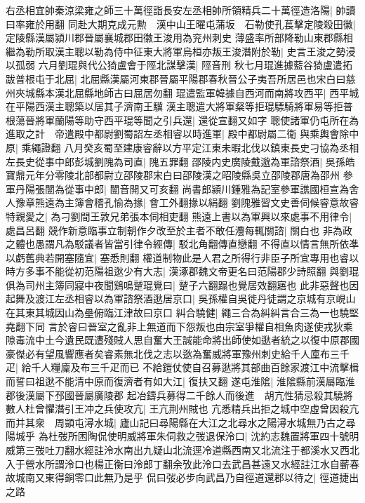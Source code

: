 右丞相宜帥秦涼梁雍之師三十萬徑詣長安左丞相帥所領精兵二十萬徑造洛陽|{
	帥讀曰率雍於用翻}
同赴大期克成元勲　漢中山王曜屯蒲坂　石勒使孔萇擊定陵殺田徽|{
	定陵縣漢屬潁川郡晉屬襄城郡田徽王浚用為兖州刺史}
薄盛率所部降勒山東郡縣相繼為勒所取漢主聰以勒為侍中征東大將軍烏桓亦叛王浚潛附於勒|{
	史言王浚之勢浸以孤弱}
六月劉琨與代公猗盧會于陘北謀擊漢|{
	陘音刑}
秋七月琨進據藍谷猗盧遣拓跋普根屯于北屈|{
	北屈縣漢屬河東郡晉屬平陽郡春秋晉公子夷吾所居邑也宋白曰慈州夾城縣本漢北屈縣地師古曰屈居勿翻}
琨遣監軍韓據自西河而南將攻西平|{
	西平城在平陽西漢主聰築以居其子濟南王驥}
漢主聰遣大將軍粲等拒琨驃騎將軍易等拒普根蕩晉將軍蘭陽等助守西平琨等聞之引兵還|{
	還從宣翻又如字}
聰使諸軍仍屯所在為進取之計　帝遣殿中都尉劉蜀詔左丞相睿以時進軍|{
	殿中都尉屬二衛}
與乘輿會除中原|{
	乘繩證翻}
八月癸亥蜀至建康睿辭以方平定江東未暇北伐以鎮東長史刁協為丞相左長史從事中郎彭城劉隗為司直|{
	隗五罪翻}
邵陵内史廣陵戴邈為軍諮祭酒|{
	吳孫皓寶鼎元年分零陵北部都尉立邵陵郡宋白曰邵陵漢之昭陵縣吳立邵陵郡唐為邵州}
參軍丹陽張闓為從事中郎|{
	闓音開又可亥翻}
尚書郎潁川鍾雅為記室參軍譙國桓宣為舍人豫章熊遠為主簿會稽孔愉為掾|{
	會工外翻掾以絹翻}
劉隗雅習文史善伺候睿意故睿特親愛之|{
	為刁劉間王敦兄弟張本伺相吏翻}
熊遠上書以為軍興以來處事不用律令|{
	處昌呂翻}
競作新意臨事立制朝作夕改至於主者不敢任灋每輒關諮|{
	關白也}
非為政之體也愚謂凡為駁議者皆當引律令經傳|{
	駁北角翻傳直戀翻}
不得直以情言無所依凖以虧舊典若開塞隨宜|{
	塞悉則翻}
權道制物此是人君之所得行非臣子所宜專用也睿以時方多事不能從初范陽祖逖少有大志|{
	漢涿郡魏文帝更名曰范陽郡少詩照翻}
與劉琨俱為司州主簿同寢中夜聞鷄鳴蹵琨覺曰|{
	蹵子六翻蹋也覺居效翻寤也}
此非惡聲也因起舞及渡江左丞相睿以為軍諮祭酒逖居京口|{
	吳孫權自吳徙丹徒謂之京城有京峴山在其東其城因山為壘俯臨江津故曰京口}
糾合驍健|{
	繩三合為糾糾言合三為一也驍堅堯翻下同}
言於睿曰晉室之亂非上無道而下怨叛也由宗室爭權自相魚肉遂使戎狄乘隙毒流中土今遺民既遭殘賊人思自奮大王誠能命將出師使如逖者統之以復中原郡國豪傑必有望風響應者矣睿素無北伐之志以逖為奮威將軍豫州刺史給千人廩布三千疋|{
	給千人糧廩及布三千疋而已}
不給鎧仗使自召募逖將其部曲百餘家渡江中流擊楫而誓曰祖逖不能清中原而復濟者有如大江|{
	復扶又翻}
遂屯淮隂|{
	淮隂縣前漢屬臨淮郡後漢屬下邳國晉屬廣陵郡}
起冶鑄兵募得二千餘人而後進　胡亢性猜忌殺其驍將數人杜曾懼潛引王冲之兵使攻亢|{
	王亢荆州賊也}
亢悉精兵出拒之城中空虛曾因殺亢而并其衆　周顗屯潯水城|{
	廬山記曰尋陽縣在大江之北尋水之陽潯水城無乃古之尋陽城乎}
為杜弢所困陶侃使明威將軍朱伺救之弢退保泠口|{
	沈約志魏置將軍四十號明威第三弢吐刀翻水經註泠水南出九疑山北流逕冷道縣西南又北流注于都溪水又西北入于營水所謂泠口也楊正衡曰泠郎丁翻余攷此泠口去武昌甚遠又水經註江水自蘄春故城南又東得銅零口此無乃是乎}
侃曰弢必步向武昌乃自徑道還郡以待之|{
	徑道捷出之路}
